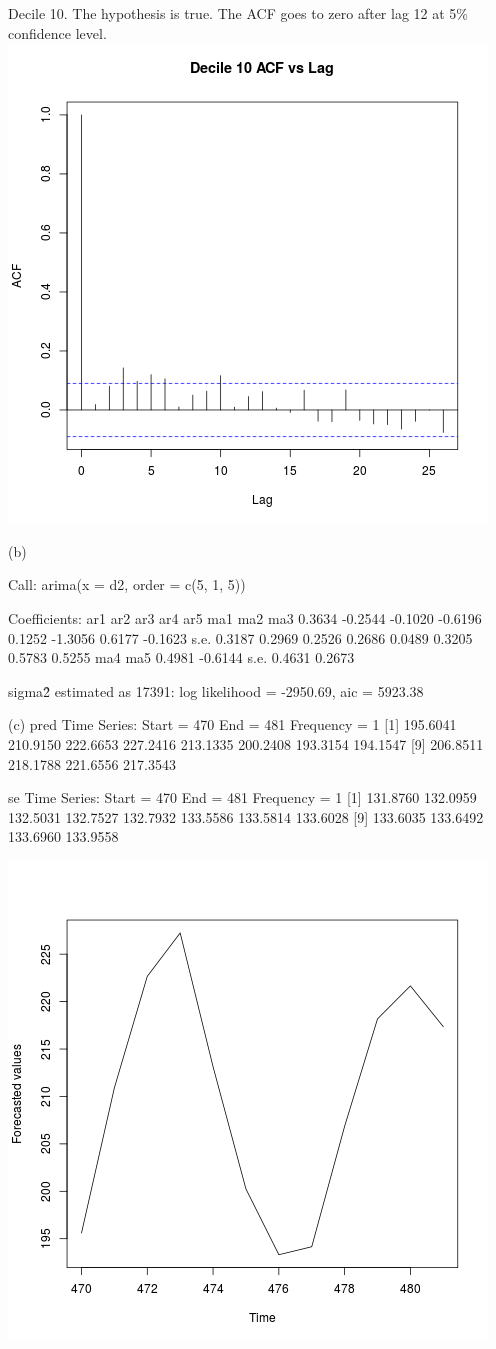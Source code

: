 \documentclass{article}
\begin{document}
Decile 10. The hypothesis is true. The ACF goes to zero after lag 12 at 5\% confidence level.
\includegraphics{"plot3_b"}
\pagebreak

(b)

Call:
arima(x = d2, order = c(5, 1, 5))

Coefficients:
         ar1      ar2      ar3      ar4     ar5      ma1     ma2      ma3
      0.3634  -0.2544  -0.1020  -0.6196  0.1252  -1.3056  0.6177  -0.1623
s.e.  0.3187   0.2969   0.2526   0.2686  0.0489   0.3205  0.5783   0.5255
         ma4      ma5
      0.4981  -0.6144
s.e.  0.4631   0.2673

sigma\^2 estimated as 17391:  log likelihood = -2950.69,  aic = 5923.38

(c)
pred
Time Series:
Start = 470 
End = 481 
Frequency = 1 
 [1] 195.6041 210.9150 222.6653 227.2416 213.1335 200.2408 193.3154 194.1547
 [9] 206.8511 218.1788 221.6556 217.3543

se
Time Series:
Start = 470 
End = 481 
Frequency = 1 
 [1] 131.8760 132.0959 132.5031 132.7527 132.7932 133.5586 133.5814 133.6028
 [9] 133.6035 133.6492 133.6960 133.9558

\includegraphics{"plot3_c"}
\pagebreak
\end{document}

